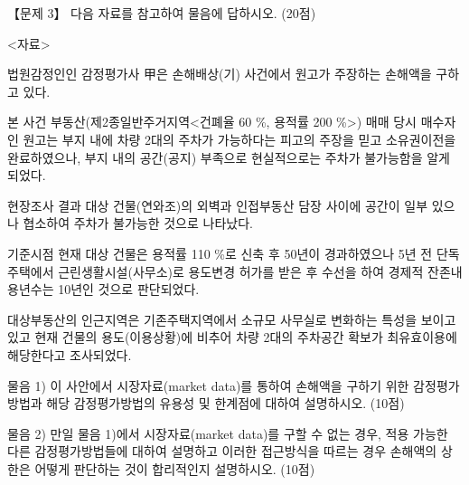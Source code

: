 \begin{longquestion}{【문제 3】}
다음 자료를 참고하여 물음에 답하시오. (20점) \par
\begin{framedtext}
<자료> \par
법원감정인인 감정평가사 甲은 손해배상(기) 사건에서 원고가 주장하는 손해액을 구하고 있다. \par
본 사건 부동산(제2종일반주거지역<건폐율 60 \%, 용적률 200 \%>) 매매 당시 매수자인 원고는 부지 내에 차량 2대의 주차가 가능하다는 피고의 주장을 믿고 소유권이전을 완료하였으나, 부지 내의 공간(공지) 부족으로 현실적으로는 주차가 불가능함을 알게 되었다. \par
현장조사 결과 대상 건물(연와조)의 외벽과 인접부동산 담장 사이에 공간이 일부 있으나 협소하여 주차가 불가능한 것으로 나타났다. \par
기준시점 현재 대상 건물은 용적률 110 \%로 신축 후 50년이 경과하였으나 5년 전 단독주택에서 근린생활시설(사무소)로 용도변경 허가를 받은 후 수선을 하여 경제적 잔존내용년수는 10년인 것으로 판단되었다. \par
대상부동산의 인근지역은 기존주택지역에서 소규모 사무실로 변화하는 특성을 보이고 있고 현재 건물의 용도(이용상황)에 비추어 차량 2대의 주차공간 확보가 최유효이용에 해당한다고 조사되었다. \par
\end{framedtext}
\medskip\noindent 물음 1) 이 사안에서 시장자료(market data)를 통하여 손해액을 구하기 위한 감정평가방법과 해당 감정평가방법의 유용성 및 한계점에 대하여 설명하시오. (10점) \par
\medskip\noindent 물음 2) 만일 물음 1)에서 시장자료(market data)를 구할 수 없는 경우, 적용 가능한 다른 감정평가방법들에 대하여 설명하고 이러한 접근방식을 따르는 경우 손해액의 상한은 어떻게 판단하는 것이 합리적인지 설명하시오. (10점) \par
\end{longquestion}
